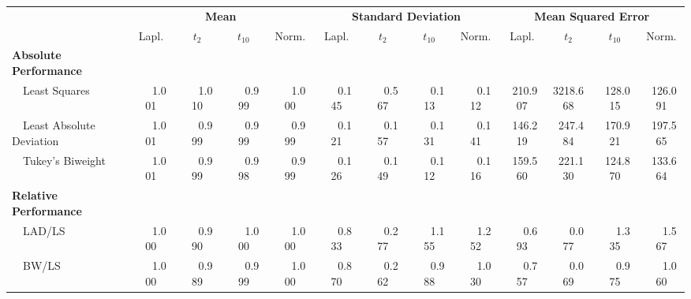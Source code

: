 %
\begin{center}
\begin{tabular}{|l||c|c|c|c||c|c|c|c||c|c|c|c|} \hline
\multicolumn{1}{|l||}{\bf }&\multicolumn{4}{c||}{\bf Mean}&\multicolumn{4}{c||}{\bf Standard Deviation}&\multicolumn{4}{c|}{\bf Mean Squared Error}\\ \cline{2-13}
\multicolumn{1}{|l||}{}&\multicolumn{1}{c|}{Lapl.}&\multicolumn{1}{c|}{$t_2$}&\multicolumn{1}{c|}{$t_{10}$}&\multicolumn{1}{c||}{Norm.}&\multicolumn{1}{c|}{Lapl.}&\multicolumn{1}{c|}{$t_2$}&\multicolumn{1}{c|}{$t_{10}$}&\multicolumn{1}{c||}{Norm.}&\multicolumn{1}{c|}{Lapl.}&\multicolumn{1}{c|}{$t_2$}&\multicolumn{1}{c|}{$t_{10}$}&\multicolumn{1}{c|}{Norm.}\\ \hline
{\bf Absolute Performance}&&&&&&&&&&&&\\
~~Least Squares&~~~1.001&~~~1.010&~~~0.999&~~~1.000&~~~0.145&~~~0.567&~~~0.113&~~~0.112&~210.907&3218.668&~128.015&~126.091\\ 
~~Least Absolute Deviation&~~~1.001&~~~0.999&~~~0.999&~~~0.999&~~~0.121&~~~0.157&~~~0.131&~~~0.141&~146.219&~247.484&~170.921&~197.565\\ 
~~Tukey's Biweight&~~~1.001&~~~0.999&~~~0.998&~~~0.999&~~~0.126&~~~0.149&~~~0.112&~~~0.116&~159.560&~221.130&~124.870&~133.664\\ \hline
{\bf Relative Performance}&&&&&&&&&&&&\\
~~LAD/LS&~~~1.000&~~~0.990&~~~1.000&~~~1.000&~~~0.833&~~~0.277&~~~1.155&~~~1.252&~~~0.693&~~~0.077&~~~1.335&~~~1.567\\ 
~~BW/LS&~~~1.000&~~~0.989&~~~0.999&~~~1.000&~~~0.870&~~~0.262&~~~0.988&~~~1.030&~~~0.757&~~~0.069&~~~0.975&~~~1.060\\ 
\hline
\end{tabular}
\end{center}
